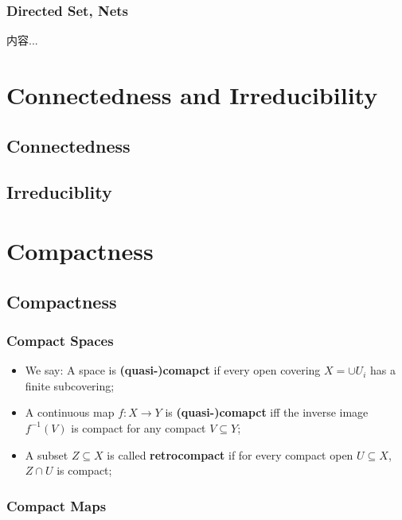 \documentclass[Total.tex]{subfiles}
\begin{document}
			\subsection{Directed Set, Nets}
				\begin{Def}
					内容...
				\end{Def}
	\chapter{Connectedness and Irreducibility}
	
		\section{Connectedness}
		
		\section{Irreduciblity}
	
	\chapter{Compactness}
		\section{Compactness}
		
			\subsection{Compact Spaces}
			
			\begin{Def}
				\begin{itemize}
					\item We say: A space is \textbf{(quasi-)comapct} if every open covering $X=\cup U_i$ has a finite subcovering;
					\item A continuous map $f:X\rightarrow Y$ is \textbf{(quasi-)comapct} iff the inverse image $f^{-1}(V)$ is compact for any compact $V\subseteq Y$;
					\item A subset $Z\subseteq X$ is called \textbf{retrocompact} if for every compact open $U\subseteq X$, $Z\cap U$ is compact;
				\end{itemize}
			\end{Def}
			
			\subsection{Compact Maps}
			
\end{document}
